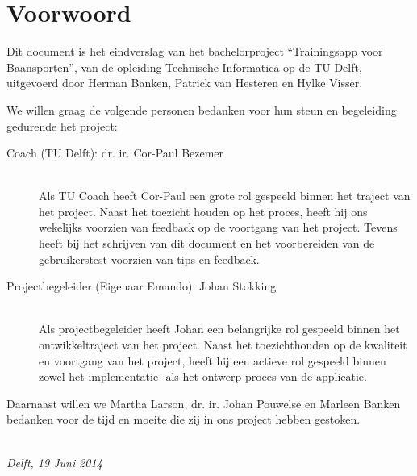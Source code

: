 \chapter*{Voorwoord}

Dit document is het eindverslag van het bachelorproject ``Trainingsapp voor Baansporten'', van de opleiding Technische Informatica op de TU Delft, uitgevoerd door Herman Banken, Patrick van Hesteren en Hylke Visser.

\medskip

\noindent We willen graag de volgende personen bedanken voor hun steun en begeleiding gedurende het project:

\medskip

\noindent

\begin{description}

\item[Coach (TU Delft): dr. ir. Cor-Paul Bezemer] ~ \\
Als TU Coach heeft Cor-Paul een grote rol gespeeld binnen het traject van het project. Naast het toezicht houden op het proces, heeft hij ons wekelijks voorzien van feedback op de voortgang van het project. Tevens heeft bij het schrijven van dit document en het voorbereiden van de gebruikerstest voorzien van tips en feedback.

\medskip

\item[Projectbegeleider (Eigenaar Emando): Johan Stokking] ~ \\
Als projectbegeleider heeft Johan een belangrijke rol gespeeld binnen het ontwikkeltraject van het project. Naast het toezichthouden op de kwaliteit en voortgang van het project, heeft hij een actieve rol gespeeld binnen zowel het implementatie- als het ontwerp-proces van de applicatie.

\end{description}

\medskip

Daarnaast willen we Martha Larson, dr. ir. Johan Pouwelse en Marleen Banken bedanken voor de tijd en moeite die zij in ons project hebben gestoken. 

\bigskip

\begin{flushright}
{\makeatletter\itshape
    \@author \\
    Delft, 19 Juni 2014
\makeatother}
\end{flushright}
